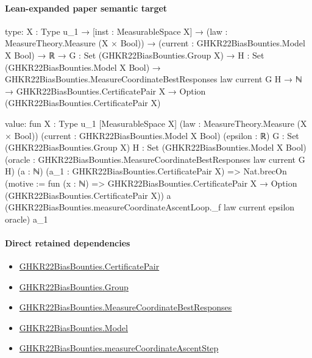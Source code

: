 \documentclass[10pt]{article}
\begin{document}
\paragraph{Lean-expanded paper semantic target}
\begin{ReviewVerbatim}
type:
{X : Type u_1} →
  [inst : MeasurableSpace X] →
    (law : MeasureTheory.Measure (X × Bool)) →
      (current : GHKR22BiasBounties.Model X Bool) →
        ℝ →
          {G : Set (GHKR22BiasBounties.Group X)} →
            {H : Set (GHKR22BiasBounties.Model X Bool)} →
              GHKR22BiasBounties.MeasureCoordinateBestResponses law current G H →
                ℕ → GHKR22BiasBounties.CertificatePair X → Option (GHKR22BiasBounties.CertificatePair X)

value:
fun {X : Type u_1} [MeasurableSpace X] (law : MeasureTheory.Measure (X × Bool))
    (current : GHKR22BiasBounties.Model X Bool) (epsilon : ℝ) {G : Set (GHKR22BiasBounties.Group X)}
    {H : Set (GHKR22BiasBounties.Model X Bool)}
    (oracle : GHKR22BiasBounties.MeasureCoordinateBestResponses law current G H) (a : ℕ)
    (a_1 : GHKR22BiasBounties.CertificatePair X) =>
  Nat.brecOn (motive := fun (x : ℕ) =>
    GHKR22BiasBounties.CertificatePair X → Option (GHKR22BiasBounties.CertificatePair X)) a
    (GHKR22BiasBounties.measureCoordinateAscentLoop._f law current epsilon oracle) a_1
\end{ReviewVerbatim}

\paragraph{Direct retained dependencies}
\begin{itemize}\raggedright
\item \hyperlink{governing-declaration-b396fb14c5f379fe}{GHKR22\allowbreak{}Bias\allowbreak{}Bounties.\allowbreak{}Certificate\allowbreak{}Pair}
\item \hyperlink{paper-prerequisite-cc7214115b27106f}{GHKR22\allowbreak{}Bias\allowbreak{}Bounties.\allowbreak{}Group}
\item \hyperlink{governing-declaration-84d84e83239c6aed}{GHKR22\allowbreak{}Bias\allowbreak{}Bounties.\allowbreak{}Measure\allowbreak{}Coordinate\allowbreak{}Best\allowbreak{}Responses}
\item \hyperlink{paper-prerequisite-333127605c12eba8}{GHKR22\allowbreak{}Bias\allowbreak{}Bounties.\allowbreak{}Model}
\item \hyperlink{paper-prerequisite-7d71dd9fa6f8250a}{GHKR22\allowbreak{}Bias\allowbreak{}Bounties.\allowbreak{}measure\allowbreak{}Coordinate\allowbreak{}Ascent\allowbreak{}Step}
\end{itemize}
\end{document}
